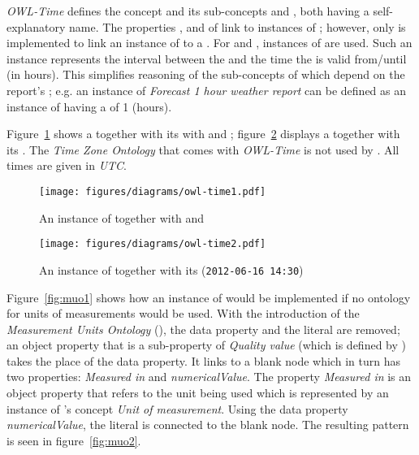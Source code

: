 \vspace{1em}

\emph{OWL-Time}\cite{owl-time} defines the concept  and its sub-concepts  and , both having a self-explanatory name. The properties ,  and  of  link to instances of ; however, only  is implemented to link an instance of  to a . For  and , instances of  are used. Such an instance represents the interval between the  and the time the  is valid from/until (in hours). This simplifies reasoning of the sub-concepts of  which depend on the report's ; e.g. an instance of \emph{Forecast 1 hour weather report} can be defined as an instance of  having a  of \num{1} (hours).

Figure~\ref{fig:owl_time1} shows a  together with its with  and ; figure~\ref{fig:owl_time2} displays a  together with its . The \emph{Time Zone Ontology} that comes with \emph{OWL-Time} is not used by \smarthomeweather. All times are given in \emph{UTC}.

\begin{figure}
  \centering
  \texttt{[image: figures/diagrams/owl-time1.pdf]}
  \caption{An instance of  together with  and }
  \label{fig:owl_time1}
\end{figure}

\begin{figure}
  \centering
  \texttt{[image: figures/diagrams/owl-time2.pdf]}
  \caption{An instance of  together with its  (\texttt{2012-06-16~14:30})}
  \label{fig:owl_time2}
\end{figure}

\vspace{1em}

Figure~\ref{fig:muo1} shows how an instance of  would be implemented if no ontology for units of measurements would be used. With the introduction of the \emph{Measurement Units Ontology} (\muo), the data property and the literal are removed; an object property that is a sub-property of \emph{Quality value} (which is defined by \muo) takes the place of the data property. It links to a blank node which in turn has two properties: \emph{Measured in} and \emph{numericalValue}. The property \emph{Measured in} is an object property that refers to the unit being used which is represented by an instance of \muo's concept \emph{Unit of measurement}. Using the data property \emph{numericalValue}, the literal is connected to the blank node. The resulting pattern is seen in figure~\ref{fig:muo2}.

